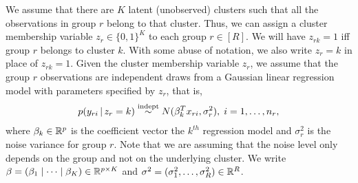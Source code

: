\documentclass[12pt]{article}
\begin{document}
We assume that there are $K$ latent (unobserved) clusters such that all the observations in group $r$ belong to that cluster. Thus, we can assign a cluster membership variable $z_{r} \in \{0,1\}^K$ to each group $r \in [R]$. We will have $z_{rk} = 1$ iff group $r$ belongs to cluster $k$.  With some abuse of notation, we also write $z_r = k$ in place of $z_{rk} = 1$.
%
%
%
%
Given the cluster membership variable $z_r$, we assume that the group $r$ observations are independent draws from a Gaussian linear regression model with parameters specified by $z_r$, that is,
\begin{align}\label{eq:gauss:mixreg:model}
	p(y_{ri} \,|\, z_{r} = k) \stackrel{\text{indept}}{\sim } N( \beta_k^T x_{ri}, \sigma_r^2), \; i =1,\dots,n_r,
\end{align}
where $\beta_k \in \mathbb{R}^p$ is the coefficient vector the $k^{th}$ regression model and $\sigma_r^2$ is the noise variance for group $r$. Note that we are assuming that the noise level only depends on the group and not on the underlying cluster.  We write $\beta = (\beta_1 \mid \dots \mid \beta_K) \in \mathbb{R}^{p \times K}$ and $\sigma^2 = (\sigma_1^2,\dots,\sigma_R^2) \in \mathbb{R}^R$.
\end{document}
